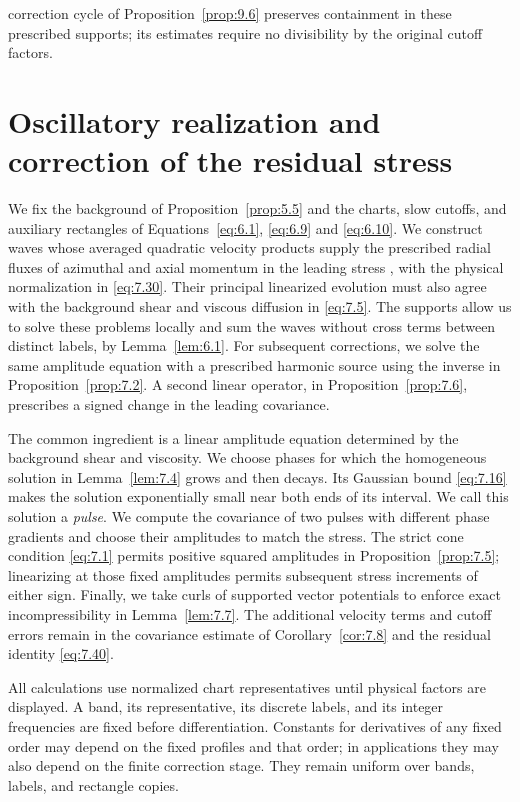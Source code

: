 %
correction cycle of Proposition~\ref{prop:9.6} preserves containment in these prescribed supports; its
estimates require no divisibility by the original cutoff factors.

\section{Oscillatory realization and correction of the residual stress}\label{sec:7}

We fix the background  of Proposition~\ref{prop:5.5} and the charts, slow cutoffs, and
auxiliary rectangles of Equations~\eqref{eq:6.1}, \eqref{eq:6.9} and \eqref{eq:6.10}. We construct waves whose averaged
quadratic velocity products supply the prescribed radial fluxes of azimuthal and axial
momentum in the leading stress , with the physical normalization in \eqref{eq:7.30}. Their principal
linearized evolution must also agree with the background shear and viscous diffusion in
\eqref{eq:7.5}. The supports allow us to solve these problems locally and sum the waves without cross
terms between distinct labels, by Lemma~\ref{lem:6.1}. For subsequent corrections, we solve the same
amplitude equation with a prescribed harmonic source using the inverse in Proposition~\ref{prop:7.2}.
A second linear operator,  in Proposition~\ref{prop:7.6}, prescribes a signed change in the leading
covariance.

The common ingredient is a linear amplitude equation determined by the background
shear and viscosity. We choose phases for which the homogeneous solution  in Lemma~\ref{lem:7.4}
grows and then decays. Its Gaussian bound \eqref{eq:7.16} makes the solution exponentially small
near both ends of its interval. We call this solution a \emph{pulse}. We compute the covariance
of two pulses with different phase gradients and choose their amplitudes to match the
stress. The strict cone condition \eqref{eq:7.1} permits positive squared amplitudes in Proposition~\ref{prop:7.5};
linearizing at those fixed amplitudes permits subsequent stress increments of either sign.
Finally, we take curls of supported vector potentials to enforce exact incompressibility in
Lemma~\ref{lem:7.7}. The additional velocity terms and cutoff errors remain in the covariance estimate
of Corollary~\ref{cor:7.8} and the residual identity \eqref{eq:7.40}.

All calculations use normalized chart representatives until physical factors are displayed.
A band, its representative, its discrete labels, and its integer frequencies are fixed before
differentiation. Constants for derivatives of any fixed order may depend on the fixed profiles
and that order; in applications they may also depend on the finite correction stage. They
remain uniform over bands, labels, and rectangle copies.

